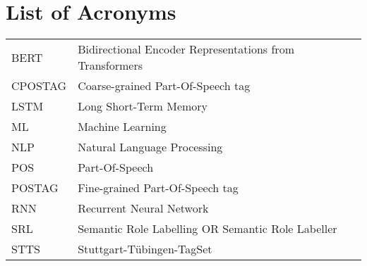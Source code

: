 {}
\chapter*{List of Acronyms}

\begin{supertabular}{lp{12.5cm}}
BERT & Bidirectional Encoder Representations from Transformers\\
CPOSTAG &  Coarse-grained Part-Of-Speech tag\\
LSTM & Long Short-Term Memory\\
ML & Machine Learning\\
NLP & Natural Language Processing\\
POS & Part-Of-Speech\\
POSTAG & Fine-grained Part-Of-Speech tag\\
RNN & Recurrent Neural Network\\
SRL & Semantic Role Labelling OR Semantic Role Labeller\\
STTS & Stuttgart-Tübingen-TagSet\\
\end{supertabular}

\newpage
